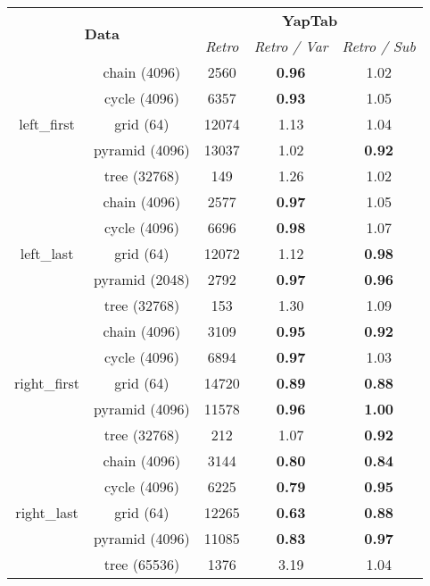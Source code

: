 \begin{table}[ht]
\centering
\small{
  \begin{tabular}{cc|ccc}
   \hline
    \hline
    \multicolumn{2}{c|}{\multirow{2}{*}{\normalsize{\textbf{Data}}}} & \multicolumn{3}{c}{\normalsize{\textbf{YapTab}}} \\
     \multicolumn{2}{c|}{} & \small{\textit{Retro}} & \textit{\small{Retro / Var}} & \textit{\small{Retro / Sub}} \\
   \hline
   \hline
   
   \multirow{5}{*}{left\_first} &  \footnotesize{chain  (4096) } &  2560 &  \textbf{0.96}  &  1.02 \\
   &  \footnotesize{cycle  (4096) } &  6357 &  \textbf{0.93}  &  1.05 \\
   &  \footnotesize{grid  (64) } &  12074 &  1.13  &  1.04 \\
   &  \footnotesize{pyramid  (4096) } &  13037 &  1.02  &  \textbf{0.92} \\
   &  \footnotesize{tree  (32768) } &  149 &  1.26  &  1.02 \\
   \hline
   \multirow{5}{*}{left\_last} &  \footnotesize{chain  (4096) } &  2577 &  \textbf{0.97}  &  1.05 \\
   &  \footnotesize{cycle  (4096) } &  6696 &  \textbf{0.98}  &  1.07 \\
   &  \footnotesize{grid  (64) } &  12072 &  1.12  &  \textbf{0.98} \\
   &  \footnotesize{pyramid  (2048) } &  2792 &  \textbf{0.97}  &  \textbf{0.96} \\
   &  \footnotesize{tree  (32768) } &  153 &  1.30  &  1.09 \\
   \hline

   \multirow{5}{*}{right\_first} &  \footnotesize{chain  (4096) } &  3109 &  \textbf{0.95}  &  \textbf{0.92} \\
   &  \footnotesize{cycle  (4096) } &  6894 &  \textbf{0.97}  &  1.03 \\
   &  \footnotesize{grid  (64) } &  14720 &  \textbf{0.89}  &  \textbf{0.88} \\
   &  \footnotesize{pyramid  (4096) } &  11578 &  \textbf{0.96}  &  \textbf{1.00} \\
   &  \footnotesize{tree  (32768) } &  212 &  1.07  &  \textbf{0.92} \\
   \hline
   \multirow{5}{*}{right\_last} &  \footnotesize{chain  (4096) } &  3144 &  \textbf{0.80}  &  \textbf{0.84} \\
   &  \footnotesize{cycle  (4096) } &  6225 &  \textbf{0.79}  &  \textbf{0.95} \\
   &  \footnotesize{grid  (64) } &  12265 &  \textbf{0.63}  &  \textbf{0.88} \\
   &  \footnotesize{pyramid  (4096) } &  11085 &  \textbf{0.83}  &  \textbf{0.97} \\
   &  \footnotesize{tree  (65536) } &  1376 &  3.19  &  1.04 \\
   \hline


\end{tabular}}
\end{table}
